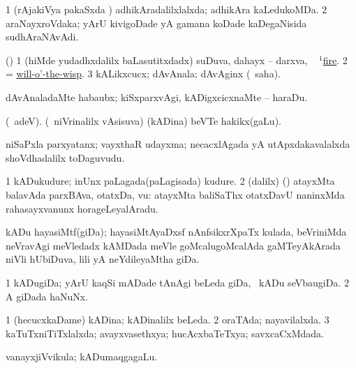 \noindent
\gl{\pagu}
\expl{}
\bmng
\bnum
\num{1}  (rAjakiVya pakaSxda \vi) adhikAradalilxlalxda; adhikAra kaLedukoMDa. 
\num{2}  araNayxroVdaka; yArU kivigoDade yA gamana koDade kaDegaNisida sudhAraNAvAdi. 
\enum
\emng
\eentry

\bentry
{} 
\gl{\nA}
\expl{}
\bmng
(\ca) 
\bnum
\num{1} (hiMde yudadhxdalilx baLasutitxdadx) suDuva, dahayx -- darxva, \kanmu\  \hyperref{kandict_f.pdf}{F}{fire(1) pagu(3)}{$^1$fire}. 
\num{2} = \hyperlink{will-o'-the-wisp}{will-o'-the-wisp}. 
\num{3} kALikxcucx; dAvAnala; dAvAginx (\rUpa\ saha). 
\enum
\emng

\noindent
\gl{\pagu}
\bmng
{} dAvAnaladaMte habaubx; kiSxparxvAgi, kADigxcicxnaMte -- haraDu. 
\emng
\eentry

\bentry
{} 
\gl{\nA}
\expl{}
\bmng
(\bava\ adeV). (\kanmu\ niVrinalilx vAsisuva) (kADina) beVTe hakikx(gaLu). 
\emng
\eentry

\bentry
{}
\gl{\nA}
\bmng
niSaPxla parxyatanx; vayxthaR udayxma; necacxlAgada yA utApxdakavalalxda shoVdhadalilx toDaguvudu. 
\emng
\eentry

\bentry
{} 
\gl{\nA}
\expl{}
\bmng
\bnum
\num{1} kADukudure; inUnx paLagada(paLagisada) kudure. 
\num{2} (\bava dalilx) (\AmA) atayxMta balavAda parxBAva, otatxDa, \mo vu:  atayxMta baliSaThx otatxDavU naninxMda rahasayxvanunx horageLeyalAradu. 
\enum
\emng
\eentry

\bentry
{}
\gl{\nA}
\bmng
kADu hayasiMtf(giDa); hayasiMtAyaDxsf nAnfsikxrXpaTx kulada, beVriniMda neVravAgi meVledadx kAMDada meVle goMcalugoMcalAda gaMTeyAkArada niVli hUbiDuva, lili yA neYdileyaMtha giDa. 
\emng
\eentry

\bentry
{}
\gl{\nA}
\bmng
\bnum
\num{1} kADugiDa; yArU kaqSi mADade tAnAgi beLeda giDa, \kanmu\ kADu seVbaugiDa. 
\num{2} A giDada haNuNx. 
\enum
\emng
\eentry

\bentry
{}
\gl{\gu}
\bmng
\bnum
\num{1} (hecucxkaDame) kADina; kADinalilx beLeda. 
\num{2} oraTAda; nayavilalxda. 
\num{3} kaTuTxniTiTxlalxda; avayxvasethxya; hucAcxbaTeTxya; savxcaCxMdada. 
\enum
\emng
\eentry

\bentry
{} 
\gl{\nA}
\expl{}
\bmng
vanayxjiVvikula; kADumaqgagaLu. 
\emng
\eentry

